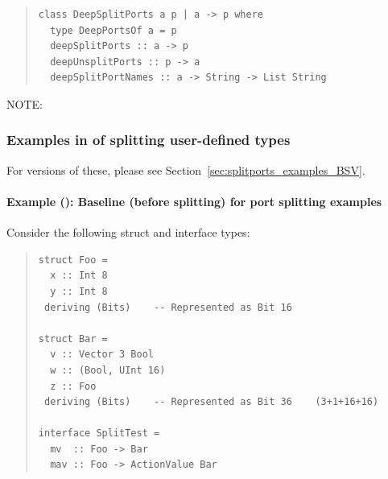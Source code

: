 \begin{quote}
\begin{verbatim}
class DeepSplitPorts a p | a -> p where
  type DeepPortsOf a = p
  deepSplitPorts :: a -> p
  deepUnsplitPorts :: p -> a
  deepSplitPortNames :: a -> String -> List String
\end{verbatim}
\end{quote}

NOTE: \hfill {}


\subsubsection{Examples in {\BHb} of splitting user-defined types}

\label{sec:splitports_examples_BH}

{\footnotesize
For {\BSVb} versions of these, please see Section~\ref{sec:splitports_examples_BSV}.}


\paragraph{Example ({\BHb}): Baseline (before splitting) for port splitting examples}

\label{sec:splitports_examples_BH_baseline}

\hspace*{1em}

Consider the following struct and interface types:
\begin{quote}
\begin{verbatim}
struct Foo =
  x :: Int 8
  y :: Int 8
 deriving (Bits)    -- Represented as Bit 16

struct Bar =
  v :: Vector 3 Bool
  w :: (Bool, UInt 16)
  z :: Foo
 deriving (Bits)    -- Represented as Bit 36    (3+1+16+16)

interface SplitTest =
  mv  :: Foo -> Bar
  mav :: Foo -> ActionValue Bar
\end{verbatim}
\end{quote}


